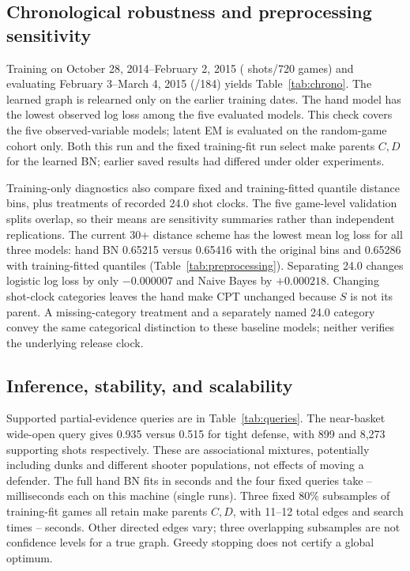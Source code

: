 \documentclass{article}
\begin{document}
\subsection{Chronological robustness and preprocessing sensitivity}
Training on October 28, 2014--February 2, 2015 (\ChronoTrainN{} shots/720 games)
and evaluating February 3--March 4, 2015 (\ChronoTestN{}/184) yields
Table~\ref{tab:chrono}. The learned graph is relearned only on the earlier training dates. The
hand model has the lowest observed log loss among the five evaluated models.
This check covers the five observed-variable models; latent EM is evaluated on
the random-game cohort only. Both
this run and the fixed training-fit run select make parents $C,D$ for the learned
BN; earlier saved results had differed under older experiments.

\begin{table}[ht]
\caption{Reproduced chronological robustness results; the cohort reuses the
original cleaned data and is not independent external validation.}
\label{tab:chrono}\centering\small
\end{table}

Training-only diagnostics also compare fixed and training-fitted quantile distance
bins, plus treatments of recorded 24.0 shot clocks. The five game-level validation
splits overlap, so their means are sensitivity summaries rather than independent
replications. The current 30+ distance scheme has the lowest mean log loss for all
three models: hand BN 0.65215 versus 0.65416 with the original bins and 0.65286
with training-fitted quantiles (Table~\ref{tab:preprocessing}). Separating 24.0
changes logistic log loss by only $-0.000007$ and Naive Bayes by $+0.000218$.
Changing shot-clock categories leaves the hand make CPT unchanged
because $S$ is not its parent. A missing-category treatment and a separately named
24.0 category convey the same categorical distinction to these baseline models;
neither verifies the underlying release clock.

\subsection{Inference, stability, and scalability}
Supported partial-evidence queries are in Table~\ref{tab:queries}. The near-basket
wide-open query gives 0.935 versus 0.515 for tight defense, with 899 and 8,273
supporting shots respectively. These are associational mixtures, potentially
including dunks and different shooter populations, not effects of moving a defender.
The full hand BN fits in \BNFitSeconds{} seconds and the four fixed queries take
\QueryMinMS{}--\QueryMaxMS{} milliseconds each on this machine (single runs).
Three fixed 80\% subsamples of training-fit games all retain make parents $C,D$,
with 11--12 total edges and search times \SearchMinSeconds{}--\SearchMaxSeconds{}
seconds. Other directed edges vary; three overlapping subsamples are not
confidence levels for a true graph. Greedy stopping does not certify a global optimum.
\end{document}
